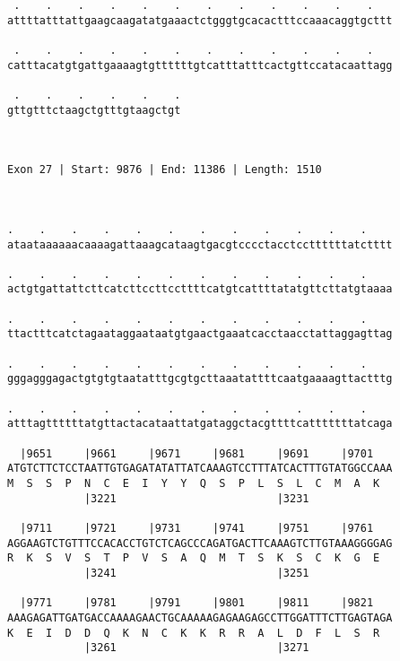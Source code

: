 \documentclass{article}
\begin{document}
\begin{Verbatim}
 .    .    .    .    .    .    .    .    .    .    .    .   
attttatttattgaagcaagatatgaaactctgggtgcacactttccaaacaggtgcttt
                                                            
 .    .    .    .    .    .    .    .    .    .    .    .   
catttacatgtgattgaaaagtgttttttgtcatttatttcactgttccatacaattagg
                                                            
 .    .    .    .    .    .
gttgtttctaagctgtttgtaagctgt
                           
                           
 
Exon 27 | Start: 9876 | End: 11386 | Length: 1510



.    .    .    .    .    .    .    .    .    .    .    .    
ataataaaaaacaaaagattaaagcataagtgacgtcccctacctccttttttatctttt
                                                            
.    .    .    .    .    .    .    .    .    .    .    .    
actgtgattattcttcatcttccttccttttcatgtcattttatatgttcttatgtaaaa
                                                            
.    .    .    .    .    .    .    .    .    .    .    .    
ttactttcatctagaataggaataatgtgaactgaaatcacctaacctattaggagttag
                                                            
.    .    .    .    .    .    .    .    .    .    .    .    
gggagggagactgtgtgtaatatttgcgtgcttaaatattttcaatgaaaagttactttg
                                                            
.    .    .    .    .    .    .    .    .    .    .    .    
atttagttttttatgttactacataattatgataggctacgttttcatttttttatcaga
                                                            
  |9651     |9661     |9671     |9681     |9691     |9701   
ATGTCTTCTCCTAATTGTGAGATATATTATCAAAGTCCTTTATCACTTTGTATGGCCAAA
M  S  S  P  N  C  E  I  Y  Y  Q  S  P  L  S  L  C  M  A  K  
            |3221                         |3231             
  
  |9711     |9721     |9731     |9741     |9751     |9761   
AGGAAGTCTGTTTCCACACCTGTCTCAGCCCAGATGACTTCAAAGTCTTGTAAAGGGGAG
R  K  S  V  S  T  P  V  S  A  Q  M  T  S  K  S  C  K  G  E  
            |3241                         |3251             
  
  |9771     |9781     |9791     |9801     |9811     |9821   
AAAGAGATTGATGACCAAAAGAACTGCAAAAAGAGAAGAGCCTTGGATTTCTTGAGTAGA
K  E  I  D  D  Q  K  N  C  K  K  R  R  A  L  D  F  L  S  R  
            |3261                         |3271             
  

\end{Verbatim}
\end{document}
